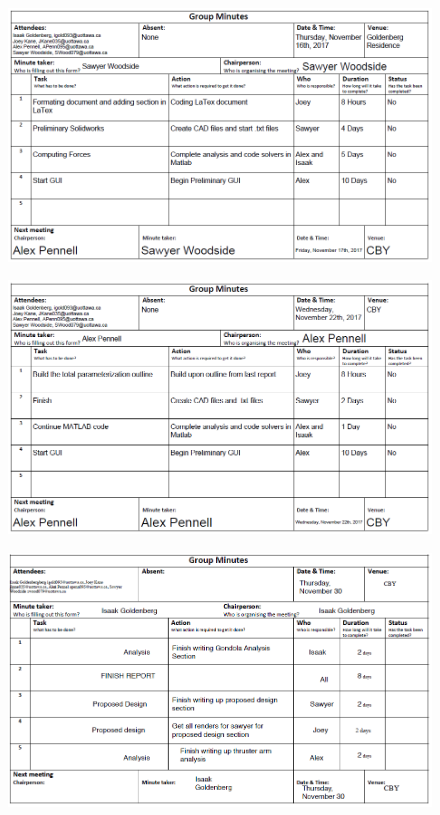 \documentclass[../main.tex]{subfiles}
\begin{document}
		\begin{figure}[H]
			\centering
			\includegraphics[height=0.8\textheight]{img/minutes/2017-11-16.PNG}
		\end{figure}
		\begin{figure}[H]
			\centering
			\includegraphics[height=0.8\textheight]{img/minutes/2017-11-22.PNG}
		\end{figure}
		\begin{figure}[H]
			\centering
			\includegraphics[height=0.8\textheight]{img/minutes/2017-11-30.PNG}
		\end{figure}
\end{document}
